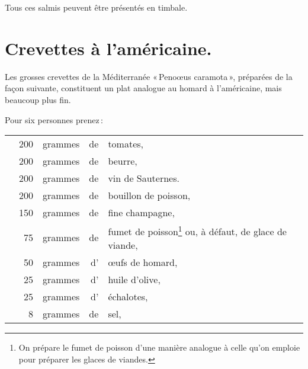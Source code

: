 \sk

Tous ces salmis peuvent être présentés en timbale.


\section*{\centering Crevettes à l'américaine.}

Les grosses crevettes de la Méditerranée « Penoœus caramota », préparées de la
façon suivante, constituent un plat analogue au homard à l'américaine, mais
beaucoup plus fin.

Pour six personnes prenez :

\medskip

\footnotesize
\begin{longtable}{rrrrp{16em}}   
  & 200 & grammes & de & tomates,                                                                         \\
  & 200 & grammes & de & beurre,                                                                          \\
  & 200 & grammes & de & vin de Sauternes.                                                                \\
  & 200 & grammes & de & bouillon de poisson,                                                             \\
  & 150 & grammes & de & fine champagne,                                                                  \\
  &  75 & grammes & de & fumet de poisson\footnote{\label{pg0285} \hypertarget{p0285}{}On prépare 
                                  le fumet de poisson d'une manière analogue à celle 
                                  qu'on emploie pour préparer les glaces de viandes.} 
                                  ou, à défaut, de glace de viande,                                       \\
  &  50 & grammes & d' & œufs de homard,                                                                  \\
  &  25 & grammes & d' & huile d'olive,                                                                   \\
  &  25 & grammes & d' & échalotes,                                                                       \\
  &   8 & grammes & de & sel,                                                                             \\

\end{longtable}
